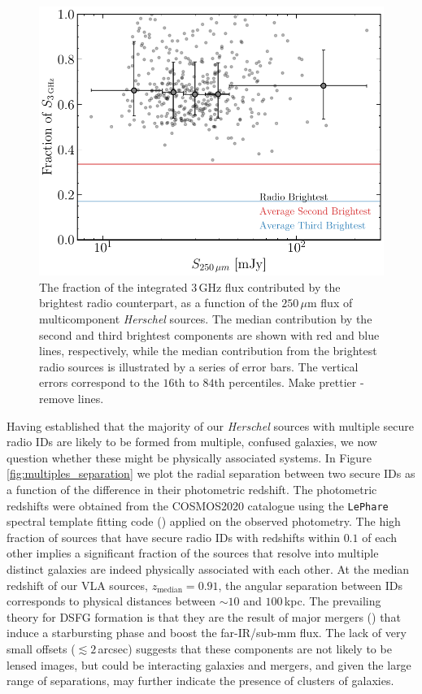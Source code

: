 \begin{figure}
	\centering
	\includegraphics[width=0.8\columnwidth]{Figures/multiples_flux_contribution.pdf}
	\caption[Contribution to total radio flux from multicomponent radio sources]{The fraction of the integrated $3\,$GHz flux contributed by the brightest radio counterpart, as a function of the $250\,\mu$m flux of multicomponent \textit{Herschel} sources. The median contribution by the second and third brightest components are shown with red and blue lines, respectively, while the median contribution from the brightest radio sources is illustrated by a series of error bars. The vertical errors correspond to the $16$th to $84$th percentiles. {\color{red}Make prettier - remove lines.}}
	\label{fig:multiples_flux_contribution}
\end{figure}

Having established that the majority of our \textit{Herschel} sources with multiple secure radio IDs are likely to be formed from multiple, confused galaxies, we now question whether these might be physically associated systems. In Figure \ref{fig:multiples_separation} we plot the radial separation between two secure IDs as a function of the difference in their photometric redshift. The photometric redshifts were obtained from the COSMOS2020 catalogue using the \texttt{LePhare} spectral template fitting code (\citealt{Arnouts_1999, Ilbert_2006}) applied on the observed photometry. The high fraction of sources that have secure radio IDs with redshifts within $0.1$ of each other implies a significant fraction of the sources that resolve into multiple distinct galaxies are indeed physically associated with each other. At the median redshift of our VLA sources, $z_\textrm{median} = 0.91$, the angular separation between IDs corresponds to physical distances between $\sim 10$ and $100\,$kpc. The prevailing theory for DSFG formation is that they are the result of major mergers (\citealt{Ivison_2002, Smail_2004, Ivison_2007, Engel_2010, Hayward_2011}) that induce a starbursting phase and boost the far-IR/sub-mm flux. The lack of very small offsets ($\lesssim 2\,$arcsec) suggests that these components are not likely to be lensed images, but could be interacting galaxies and mergers, and given the large range of separations, may further indicate the presence of clusters of galaxies.

